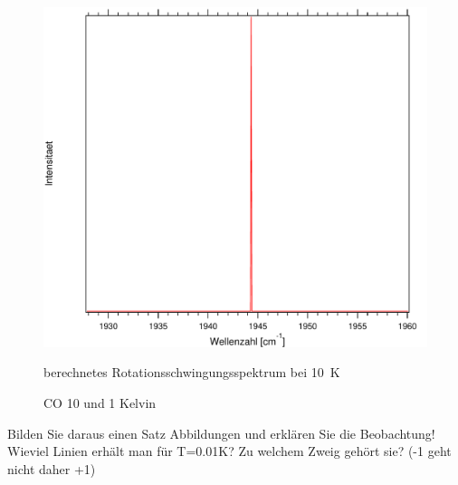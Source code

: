 \begin{figure}[H]
\centering	
	\begin{minipage}{0.47\linewidth}
	\includegraphics[width=\linewidth]{Bilder/001CO.pdf}
	\caption{berechnetes Rotationsschwingungsspektrum bei 10~K}
	\end{minipage}

	\caption{CO 10 und 1 Kelvin}
	
	
\end{figure}


Bilden Sie daraus einen Satz Abbildungen und erklären Sie die Beobachtung! Wieviel Linien erhält man für T=0.01K? Zu welchem Zweig gehört sie? (-1 geht nicht daher +1)



